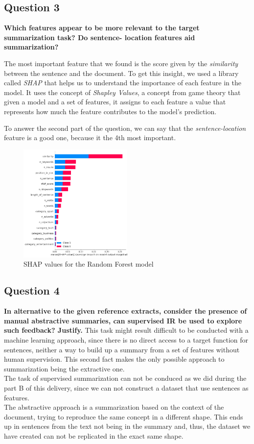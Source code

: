 \subsection{Question 3}
\textbf{Which features appear to be more relevant to the target summarization task? Do sentence- location features aid summarization?}

The most important feature that we found is the score given by the \textit{similarity} between the sentence and the document. To get this 
insight, we used a library called \textit{SHAP} that helps us to understand the importance of each feature in the model. It uses the concept of 
\textit{Shapley Values}, a concept from game theory that given a model and a set of features, it assigns to each feature a value that represents
how much the feature contributes to the model's prediction. 

To answer the second part of the question, we can say that the \textit{sentence-location} feature is a good one, because it the 4th most important.

\begin{figure}[H]
  \centering
  \includegraphics[width=0.5\textwidth]{images/shap.png}
  \caption{SHAP values for the Random Forest model}
  \label{fig:shap_values}
\end{figure}

\subsection{Question 4}
\textbf{In alternative to the given reference extracts, consider the presence of manual abstractive summaries, can supervised IR be used to explore such feedback? Justify.}
This task might result difficult to be conducted with a machine learning approach, since there is no direct access to a target function for sentences, neither a way to build up a summary from a set of features without human supervision. This second fact makes the only possible approach to summarization being the extractive one. \\
The task of supervised summarization can not be conduced as we did during the part B of this delivery, since we can not construct a dataset that use sentences as features.\\
The abstractive approach is a summarization based on the context of the document, trying to reproduce the same concept in a different shape. This ends up in sentences from the text not being in the summary and, thus, the dataset we have created can not be replicated in the exact same shape. 

